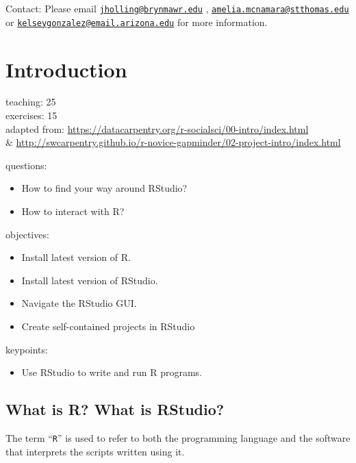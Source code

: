 \documentclass[]{book}
\providecommand{\tightlist}{%
  \setlength{\itemsep}{0pt}\setlength{\parskip}{0pt}}
\begin{document}
Contact: Please email
\href{mailto:jholling@brynmawr.edu}{\nolinkurl{jholling@brynmawr.edu}} ,
\href{mailto:amelia.mcnamara@stthomas.edu}{\nolinkurl{amelia.mcnamara@stthomas.edu}}
or
\href{mailto:kelseygonzalez@email.arizona.edu}{\nolinkurl{kelseygonzalez@email.arizona.edu}}
for more information.

\chapter{Introduction}\label{intro}

teaching: 25\\
exercises: 15\\
adapted from:
\url{https://datacarpentry.org/r-socialsci/00-intro/index.html}\\
\&
\url{http://swcarpentry.github.io/r-novice-gapminder/02-project-intro/index.html}

questions:

\begin{itemize}
\tightlist
\item
  How to find your way around RStudio?\\
\item
  How to interact with R?
\end{itemize}

objectives:

\begin{itemize}
\tightlist
\item
  Install latest version of R.\\
\item
  Install latest version of RStudio.\\
\item
  Navigate the RStudio GUI.
\item
  Create self-contained projects in RStudio
\end{itemize}

keypoints:

\begin{itemize}
\tightlist
\item
  Use RStudio to write and run R programs.
\end{itemize}

\section{What is R? What is RStudio?}\label{what-is-r-what-is-rstudio}

The term ``\texttt{R}'' is used to refer to both the programming
language and the software that interprets the scripts written using it.
\end{document}
